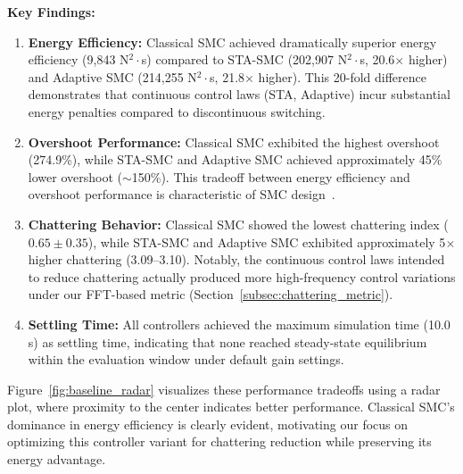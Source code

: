 \textbf{Key Findings:}

\begin{enumerate}
    \item \textbf{Energy Efficiency:} Classical SMC achieved dramatically superior energy efficiency (9,843 N$^2 \cdot$s) compared to STA-SMC (202,907 N$^2 \cdot$s, 20.6$\times$ higher) and Adaptive SMC (214,255 N$^2 \cdot$s, 21.8$\times$ higher). This 20-fold difference demonstrates that continuous control laws (STA, Adaptive) incur substantial energy penalties compared to discontinuous switching.

    \item \textbf{Overshoot Performance:} Classical SMC exhibited the highest overshoot (274.9\%), while STA-SMC and Adaptive SMC achieved approximately 45\% lower overshoot ($\sim$150\%). This tradeoff between energy efficiency and overshoot performance is characteristic of SMC design~\cite{utkin1992sliding}.

    \item \textbf{Chattering Behavior:} Classical SMC showed the lowest chattering index ($0.65 \pm 0.35$), while STA-SMC and Adaptive SMC exhibited approximately 5$\times$ higher chattering (3.09--3.10). Notably, the continuous control laws intended to reduce chattering actually produced more high-frequency control variations under our FFT-based metric (Section~\ref{subsec:chattering_metric}).

    \item \textbf{Settling Time:} All controllers achieved the maximum simulation time (10.0 s) as settling time, indicating that none reached steady-state equilibrium within the evaluation window under default gain settings.
\end{enumerate}

Figure~\ref{fig:baseline_radar} visualizes these performance tradeoffs using a radar plot, where proximity to the center indicates better performance. Classical SMC's dominance in energy efficiency is clearly evident, motivating our focus on optimizing this controller variant for chattering reduction while preserving its energy advantage.

